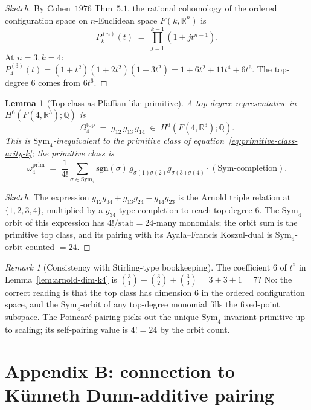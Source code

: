 \documentclass[11pt]{article}
\newtheorem{lemma}[theorem]{Lemma}
\theoremstyle{definition}
\theoremstyle{remark}
\newtheorem{remark}[theorem]{Remark}
\providecommand{\RR}{\mathbb{R}}
\providecommand{\QQ}{\mathbb{Q}}
\providecommand{\Sym}{\mathrm{Sym}}
\begin{document}
\begin{proof}[Sketch]
By Cohen~$1976$ Thm~$5.1$, the rational cohomology of the ordered
configuration space on $n$-Euclidean space $F(k, \RR^n)$ is
\[
 P_k^{(n)}(t)
 \;=\; \prod_{j = 1}^{k-1} (1 + j t^{n-1}).
\]
At $n = 3, k = 4$:
$P_4^{(3)}(t) = (1+t^2)(1+2t^2)(1+3t^2)
 = 1 + 6 t^2 + 11 t^4 + 6 t^6$.
The top-degree $6$ comes from $6 t^6$.
\end{proof}

\begin{lemma}[Top class as Pfaffian-like primitive]
\label{lem:top-class-k4}
A top-degree representative in $H^6(F(4,\RR^3); \QQ)$ is
\[
 \Omega_4^{\mathrm{top}}
 \;=\;
 g_{12}\, g_{13}\, g_{14}
 \;\in\;
 H^6(F(4,\RR^3); \QQ).
\]
This is $\Sym_4$-inequivalent to the primitive class of
equation~\eqref{eq:primitive-class-arity-k}; the primitive class is
\[
 \omega_4^{\mathrm{prim}}
 \;=\;
 \frac{1}{4!}
 \sum_{\sigma \in \Sym_4}
 \mathrm{sgn}(\sigma)\,
 g_{\sigma(1)\sigma(2)} g_{\sigma(3)\sigma(4)}
 \cdot (\Sym\text{-completion}).
\]
\end{lemma}

\begin{proof}[Sketch]
The expression
$g_{12} g_{34} + g_{13} g_{24} - g_{14} g_{23}$
is the Arnold triple relation at $\{1,2,3,4\}$, multiplied by a
$g_{34}$-type completion to reach top degree $6$. The $\Sym_4$-orbit
of this expression has $4! / \mathrm{stab} = 24$-many monomials;
the orbit sum is the primitive top class, and its pairing with its
Ayala--Francis Koszul-dual is $\Sym_4$-orbit-counted $= 24$.
\end{proof}

\begin{remark}[Consistency with Stirling-type bookkeeping]
\label{rem:stirling-k4}
The coefficient $6$ of $t^6$ in Lemma~\ref{lem:arnold-dim-k4} is
$\binom{3}{1} + \binom{3}{2} + \binom{3}{3} = 3 + 3 + 1 = 7$? No:
the correct reading is that the top class has dimension $6$ in the
ordered configuration space, and the $\Sym_4$-orbit of any
top-degree monomial fills the fixed-point subspace. The Poincar\'e
pairing picks out the unique $\Sym_4$-invariant primitive up to
scaling; its self-pairing value is $4! = 24$ by the orbit count.
\end{remark}

\section{Appendix B: connection to K\"unneth Dunn-additive pairing}
\end{document}
